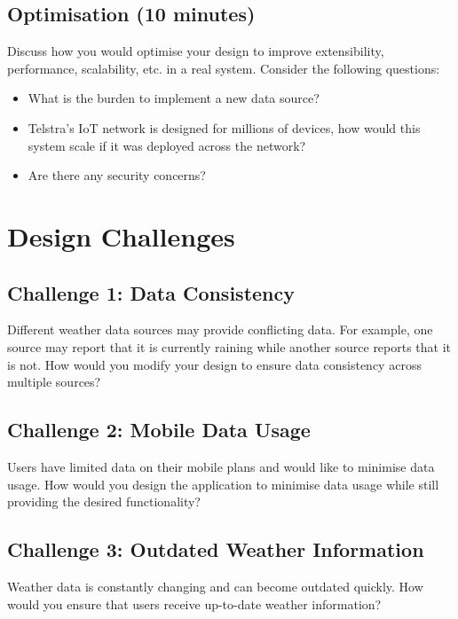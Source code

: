 \documentclass{csse4400}
\begin{document}
\subsection*{Optimisation (10 minutes)}
Discuss how you would optimise your design to improve extensibility, performance, scalability, etc. in a real system.
Consider the following questions:
\begin{itemize}
\item What is the burden to implement a new data source?
\item Telstra's IoT network is designed for millions of devices, how would this system scale if it was deployed across the network?
\item Are there any security concerns?
\end{itemize}

\section{Design Challenges}

\subsection*{Challenge 1: Data Consistency}
Different weather data sources may provide conflicting data.
For example, one source may report that it is currently raining while another source reports that it is not.
How would you modify your design to ensure data consistency across multiple sources?

\subsection*{Challenge 2: Mobile Data Usage}
Users have limited data on their mobile plans and would like to minimise data usage.
How would you design the application to minimise data usage while still providing the desired functionality?

\subsection*{Challenge 3: Outdated Weather Information}
Weather data is constantly changing and can become outdated quickly.
How would you ensure that users receive up-to-date weather information?
\end{document}
